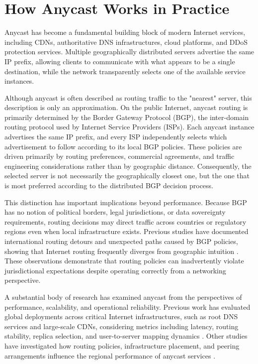 \documentclass[acmsmall]{acmart}
\begin{document}
\section{How Anycast Works in Practice}
\label{sec:background}

Anycast has become a fundamental building block of modern Internet services, including CDNs, authoritative DNS infrastructures, cloud platforms, and DDoS protection services. Multiple geographically distributed servers advertise the same IP prefix, allowing clients to communicate with what appears to be a single destination, while the network transparently selects one of the available service instances.

Although anycast is often described as routing traffic to the "nearest" server, this description is only an approximation. On the public Internet, anycast routing is primarily determined by the Border Gateway Protocol (BGP), the inter-domain routing protocol used by Internet Service Providers (ISPs). Each anycast instance advertises the same IP prefix, and every ISP independently selects which advertisement to follow according to its local BGP policies. These policies are driven primarily by routing preferences, commercial agreements, and traffic engineering considerations rather than by geographic distance. Consequently, the selected server is not necessarily the geographically closest one, but the one that is most preferred according to the distributed BGP decision process.

This distinction has important implications beyond performance. Because BGP has no notion of political borders, legal jurisdictions, or data sovereignty requirements, routing decisions may direct traffic across countries or regulatory regions even when local infrastructure exists. Previous studies have documented international routing detours and unexpected paths caused by BGP policies, showing that Internet routing frequently diverges from geographic intuition \cite{Comarela2016DetectingApplications, Shah2016TowardsDetours, Sun2021SecuringAttacks}. These observations demonstrate that routing policies can inadvertently violate jurisdictional expectations despite operating correctly from a networking perspective.

A substantial body of research has examined anycast from the perspectives of performance, scalability, and operational reliability. Previous work has evaluated global deployments across critical Internet infrastructures, such as root DNS services and large-scale CDNs, considering metrics including latency, routing stability, replica selection, and user-to-server mapping dynamics \cite{Li2023EvaluatingScope, Calder2015AnalyzingCDN, Koch2021AnycastSystems}. Other studies have investigated how routing policies, infrastructure placement, and peering arrangements influence the regional performance of anycast services \cite{Zhou2023RegionalPotentials}.
\end{document}
